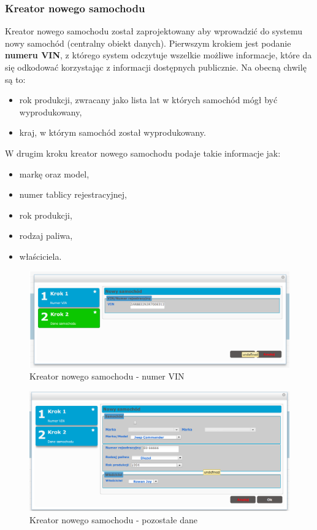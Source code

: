 	\subsubsection{Kreator nowego samochodu}
		Kreator nowego samochodu został zaprojektowany aby wprowadzić do systemu nowy samochód (centralny obiekt danych). 
		Pierwszym krokiem jest podanie \textbf{numeru VIN}, z którego system odczytuje wszelkie możliwe informacje, które
		da się odkodować korzystając z informacji dostępnych publicznie. Na obecną chwilę są to:
		\begin{itemize}
			\item rok produkcji, zwracany jako lista lat w których samochód mógł być wyprodukowany,
			\item kraj, w którym samochód został wyprodukowany.
		\end{itemize}
		W drugim kroku kreator nowego samochodu podaje takie informacje jak:
		\begin{itemize}
			\item markę oraz model,
			\item numer tablicy rejestracyjnej,
			\item rok produkcji,
			\item rodzaj paliwa,
			\item właściciela.
		\end{itemize}
		\begin{figure}[H]
			\centering
			\includegraphics[width=1.0\textwidth]{images/newCar-vin}
			\caption[Kreator nowego samochodu - numer VIN]{
				Kreator nowego samochodu - numer VIN
			}
			\label{app:newCar_vin}
		\end{figure}	
		\begin{figure}[h]
			\centering
			\includegraphics[width=1.0\textwidth]{images/newCar-data}
			\caption[Kreator nowego samochodu - pozostałe dane]{
				Kreator nowego samochodu - pozostałe dane
			}
			\label{app:newCar_data}
		\end{figure}
	
